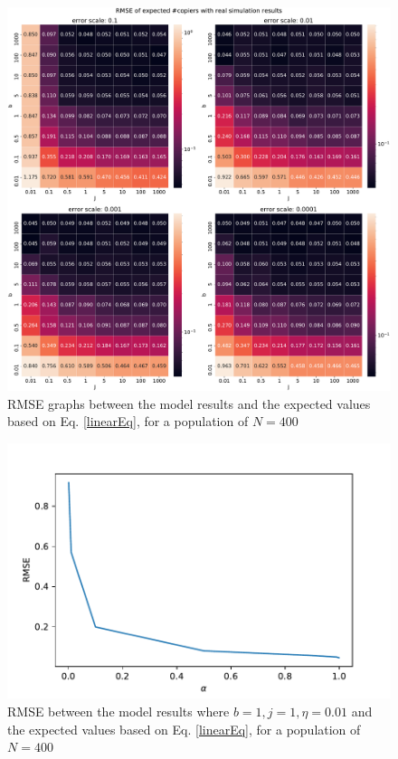 \documentclass[11pt]{article}
\begin{document}
\begin{figure}
    \includegraphics[width=\linewidth]{GBD_rmse_heatmap.pdf}
    \caption{RMSE graphs between the model results and the expected values based on Eq. \ref{linearEq}, for a population of $N=400$}
    \label{RMSE}
\end{figure}

\begin{figure}
    \includegraphics[width=\linewidth]{alpha_rmse.pdf}
    \caption{RMSE between the model results where $b=1,j=1,\eta=0.01$ and the expected values based on Eq. \ref{linearEq}, for a population of $N=400$}
    \label{RMSE:alpha}
\end{figure}
\end{document}
